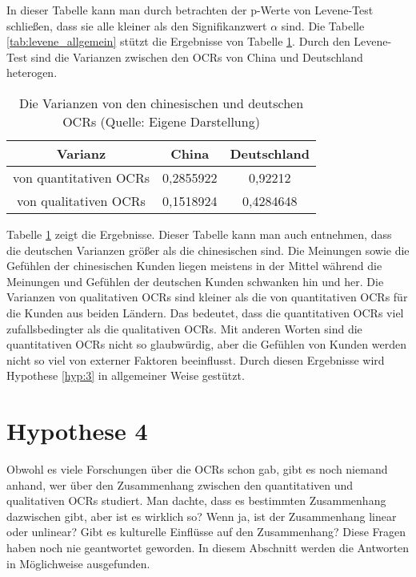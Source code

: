 In dieser Tabelle kann man durch betrachten der p-Werte von Levene-Test schließen, dass sie alle kleiner als den Signifikanzwert $\alpha$ sind. Die Tabelle \ref{tab:levene_allgemein} stützt die Ergebnisse von Tabelle \ref{tab:varianz_allgemein}. Durch den Levene-Test sind die Varianzen zwischen den \ac{OCRs} von China und Deutschland heterogen.

\begin{table}[htb]
\centering
\begin{tabular}{|c|c|c|}
\hline
Varianz                & China     & Deutschland \\ \hline
von quantitativen \ac{OCRs} & 0,2855922 & 0,92212     \\ \hline
von qualitativen \ac{OCRs}  & 0,1518924 & 0,4284648   \\ \hline
\end{tabular}
\caption[Die Varianzen von den chinesischen und deutschen OCRs]{Die Varianzen von den chinesischen und deutschen \ac{OCRs} (Quelle: Eigene Darstellung)}
\label{tab:varianz_allgemein}
\end{table}

Tabelle \ref{tab:varianz_allgemein} zeigt die Ergebnisse. Dieser Tabelle kann man auch entnehmen, dass die deutschen Varianzen größer als die chinesischen sind. Die Meinungen sowie die Gefühlen der chinesischen Kunden liegen meistens in der Mittel während die Meinungen und Gefühlen der deutschen Kunden schwanken hin und her. Die Varianzen von qualitativen \ac{OCRs} sind kleiner als die von quantitativen \ac{OCRs} für die Kunden aus beiden Ländern. Das bedeutet, dass die quantitativen \ac{OCRs} viel zufallsbedingter als die qualitativen \ac{OCRs}. Mit anderen Worten sind die quantitativen \ac{OCRs} nicht so glaubwürdig, aber die Gefühlen von Kunden werden nicht so viel von externer Faktoren beeinflusst. Durch diesen Ergebnisse wird Hypothese \ref{hyp:3} in allgemeiner Weise gestützt.
\section{Hypothese 4} \label{sec:h4}
Obwohl es viele Forschungen über die \acl{OCRs} schon gab, gibt es noch niemand anhand, wer über den Zusammenhang zwischen den quantitativen und qualitativen \ac{OCRs} studiert. Man dachte, dass es bestimmten Zusammenhang dazwischen gibt, aber ist es wirklich so? Wenn ja, ist der Zusammenhang linear oder unlinear? Gibt es kulturelle Einflüsse auf den Zusammenhang? Diese Fragen haben noch nie geantwortet geworden. In diesem Abschnitt werden die Antworten in Möglichweise ausgefunden.
